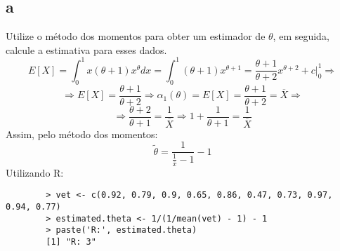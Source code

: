 \documentclass{article}[twocolumn]
\begin{document}
	\subsection{a}
	Utilize o método dos momentos para obter um estimador de $\theta$, em seguida, calcule a
	estimativa para esses dados.	
	\begin{equation}
		E[X] = \int_0^1x(\theta + 1)x^\theta dx = \int_0^1(\theta + 1)x^{\theta + 1} =
		\frac{\theta + 1}{\theta + 2}x^{\theta + 2} + c\big|_0^1 \Rightarrow
		\nonumber
	\end{equation}
	\begin{equation}
		\Rightarrow E[X] = \frac{\theta + 1}{\theta + 2} \Rightarrow
		\alpha_1(\theta) = E[X] = \frac{\theta + 1}{\theta + 2} = \overline{X} \Rightarrow
		\nonumber
	\end{equation}
	\begin{equation}
		\Rightarrow \frac{\theta + 2}{\theta + 1} = \frac{1}{\overline{X}} \Rightarrow
		1 + \frac{1}{\theta + 1} = \frac{1}{\overline{X}}
		\nonumber
	\end{equation}
	Assim, pelo m\'etodo dos momentos:
	\begin{equation}
		\tilde{\theta} = \frac{1}{\frac{1}{\overline{x}} - 1} - 1
		\nonumber
	\end{equation}
	Utilizando R:
	\begin{verbatim}
		> vet <- c(0.92, 0.79, 0.9, 0.65, 0.86, 0.47, 0.73, 0.97, 0.94, 0.77)
		> estimated.theta <- 1/(1/mean(vet) - 1) - 1
		> paste('R:', estimated.theta)
		[1] "R: 3"
	\end{verbatim}
\end{document}
